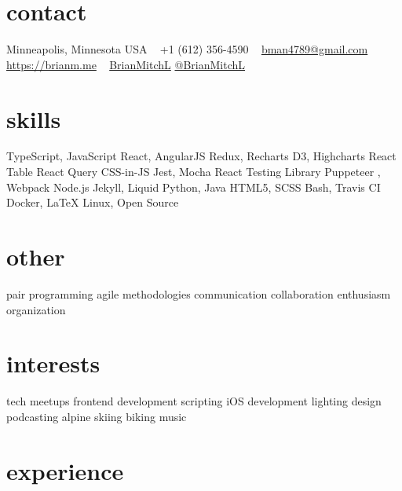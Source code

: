 \documentclass[]{cv-style} %
\begin{document}
\lastupdated


\begin{aside} %
\section{contact}
\small{Minneapolis, Minnesota USA}
~
+1 (612) 356-4590
~
\href{mailto:bman4789@gmail.com}{bman4789@gmail.com}
~
\href{https://brianm.me}{https://brianm.me}
~
\href{https://github.com/BrianMitchL}{\textcolor{headercolor}{ }BrianMitchL}
\href{https://twitter.com/BrianMitchL}{\textcolor{twitter}{ }@BrianMitchL}
\section{skills}
TypeScript, JavaScript
React, AngularJS
Redux, Recharts
D3, Highcharts
React Table
React Query
CSS-in-JS
Jest, Mocha
React Testing Library
Puppeteer
, Webpack
Node.js
Jekyll, Liquid
Python, Java
HTML5, SCSS
Bash, Travis CI
Docker, \LaTeX
Linux, Open Source
\section{other}
pair programming
agile methodologies
communication
collaboration
enthusiasm
organization
\section{interests}
tech meetups
frontend development
scripting
iOS development
lighting design
podcasting
alpine skiing
biking
music
\end{aside}



\section{experience}

%
%
%
%
\end{document}
